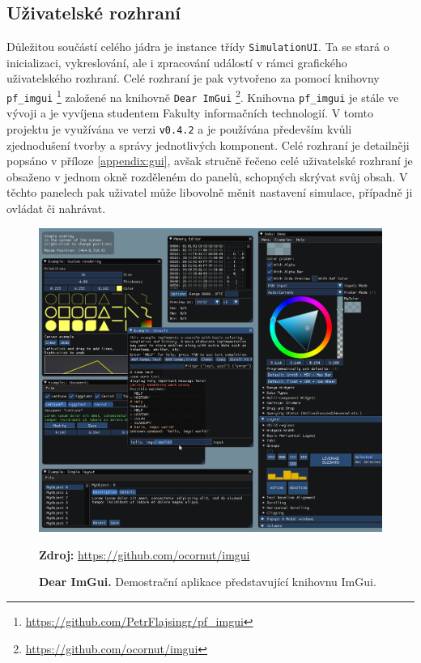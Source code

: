 \subsection{Uživatelské rozhraní}
\label{chapter:uzivRozh}

Důležitou součástí celého jádra je instance třídy \texttt{SimulationUI}. Ta se stará o inicializaci, vykreslování, ale i zpracování událostí v rámci grafického uživatelského rozhraní. Celé rozhraní je pak vytvořeno za pomocí knihovny \texttt{pf\_imgui} \footnote{\url{https://github.com/PetrFlajsingr/pf_imgui}} založené na knihovně \texttt{Dear ImGui} \footnote{\url{https://github.com/ocornut/imgui}}. Knihovna \texttt{pf\_imgui} je stále ve vývoji a je vyvíjena studentem Fakulty informačních technologií. V tomto projektu je využívána ve verzi  \texttt{v0.4.2} a je používána především kvůli zjednodušení tvorby a správy jednotlivých komponent. Celé rozhraní je detailněji popsáno v příloze \ref{appendix:gui}, avšak stručně řečeno celé uživatelské rozhraní je obsaženo v jednom okně rozděleném do panelů, schopných skrývat svůj obsah. V těchto panelech pak uživatel může libovolně měnit nastavení simulace, případně ji ovládat či nahrávat.

\begin{figure}[hbt]
	\centering
	\captionsetup{justification=centering}
	\includegraphics[scale=0.2]{obrazky-figures/imgui.png}
	\caption{\textbf{Dear ImGui.} Demostrační aplikace představující knihovnu ImGui.}
	\textbf{Zdroj: } \url{https://github.com/ocornut/imgui}
	\label{fig:structsEvap}
\end{figure}

